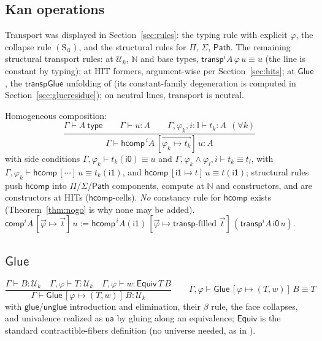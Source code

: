 \documentclass{lmcs}
\newcommand{\I}{\mathbb{I}}
\newcommand{\transp}{\mathsf{transp}}
\newcommand{\hcomp}{\mathsf{hcomp}}
\newcommand{\vcomp}{\mathsf{comp}}
\newcommand{\ua}{\mathsf{ua}}
\newcommand{\Glue}{\mathsf{Glue}}
\newcommand{\glue}{\mathsf{glue}}
\newcommand{\unglue}{\mathsf{unglue}}
\renewcommand{\conv}{\equiv}
\newcommand{\Path}{\mathsf{Path}}
\newcommand{\U}{\mathcal{U}}
\newcommand{\ii}{\mathsf{i1}}
\newcommand{\io}{\mathsf{i0}}
\begin{document}
\subsection{Kan operations}

Transport was displayed in Section~\ref{sec:rules}: the typing rule
with explicit $\varphi$, the collapse rule $(\mathrm{S}_{\ii})$, and
the structural rules for $\Pi$, $\Sigma$, $\Path$.  The remaining
structural transport rules: at $\U_k$, $\mathbb{N}$ and base types,
$\transp^i A\,\varphi\,u \conv u$ (the line is constant by
typing); at HIT formers, argument-wise per
Section~\ref{sec:hits}; at $\Glue$, the $\mathsf{transpGlue}$
unfolding of \cite[\S6.2]{CCHM} (its constant-family degeneration is
computed in Section~\ref{sec:glueresidue}); on neutral lines,
transport is neutral.

Homogeneous composition:
\[
  \frac{\Gamma \vdash A\ \mathsf{type} \qquad
        \Gamma \vdash u : A \qquad
        \Gamma, \varphi_k, i{:}\I \vdash t_k : A\ \ (\forall k)}
       {\Gamma \vdash \hcomp^{\,i} A\,
         [\overrightarrow{\varphi_k \mapsto t_k}]\,u : A}
\]
with side conditions
$\Gamma, \varphi_k \vdash t_k(\io) \conv u$ and
$\Gamma, \varphi_k \wedge \varphi_l, i \vdash t_k \conv t_l$,
with $\Gamma, \varphi_k \vdash
\hcomp\,[\cdots]\,u \conv t_k(\ii)$, and
$\hcomp\,[\ii \mapsto t]\,u \conv t(\ii)$; structural rules push
$\hcomp$ into $\Pi$/$\Sigma$/$\Path$ components, compute at
$\mathbb{N}$ and constructors, and are constructors at HITs
($\hcomp$-cells).  \emph{No} constancy rule for $\hcomp$ exists
(Theorem~\ref{thm:nogo} is why none may be added).
$\vcomp^i A\,[\vec\varphi \mapsto \vec t]\,u :=
\hcomp^{\,i} A(\ii)\,[\vec\varphi \mapsto
\transp\text{-filled } \vec t]\,(\transp^i A\,\io\,u)$.

\subsection{$\Glue$}

\[
  \frac{\Gamma \vdash B : \U_k \quad
        \Gamma, \varphi \vdash T : \U_k \quad
        \Gamma, \varphi \vdash w : \mathsf{Equiv}\,T\,B}
       {\Gamma \vdash \Glue\,[\varphi \mapsto (T,w)]\,B : \U_k}
  \qquad
  \Gamma, \varphi \vdash \Glue\,[\varphi \mapsto (T,w)]\,B \conv T
\]
with $\glue$/$\unglue$ introduction and elimination, their $\beta$
rule, the face collapses, and univalence realized as $\ua$ by gluing
along an equivalence; $\mathsf{Equiv}$ is the standard
contractible-fibers definition (no universe needed, as in
\cite{SterlingAngiuli}).
\end{document}
